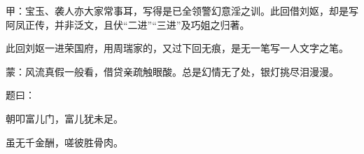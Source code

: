 

\begin{parag}
    \begin{note}甲：宝玉、袭人亦大家常事耳，写得是已全领警幻意淫之训。此回借刘妪，却是写阿凤正传，并非泛文，且伏“二进”“三进”及巧姐之归著。\end{note}
\end{parag}


\begin{parag}
    \begin{note}此回刘妪一进荣国府，用周瑞家的，又过下回无痕，是无一笔写一人文字之笔。\end{note}
\end{parag}


\begin{parag}
    \begin{note}蒙：风流真假一般看，借贷亲疏触眼酸。总是幻情无了处，银灯挑尽泪漫漫。\end{note}
\end{parag}


\begin{parag}
    题曰：
\end{parag}


\begin{poem}
    \begin{pl}朝叩富儿门，富儿犹未足。\end{pl}

    \begin{pl}虽无千金酬，嗟彼胜骨肉。\end{pl}
\end{poem}


